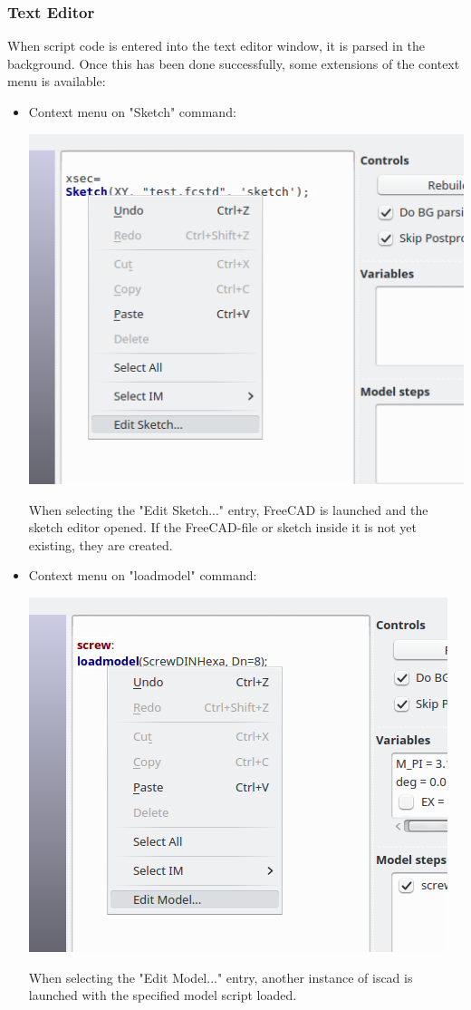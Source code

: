 \subsubsection{Text Editor}

When script code is entered into the text editor window, it is parsed in
the background. Once this has been done successfully, some extensions of
the context menu is available:

\begin{itemize}
\item Context menu on "Sketch" command:

    \includegraphics[width=0.33\linewidth]{figs/iscad/screenshot_iscad_context_sketch}
    
    When selecting the "Edit Sketch..." entry, FreeCAD is launched and
    the sketch editor opened. If the FreeCAD-file or sketch inside it is
    not yet existing, they are created.
\item Context menu on "loadmodel" command:

    \includegraphics[width=0.33\linewidth]{figs/iscad/screenshot_iscad_context_loadmodel}
    
    When selecting the "Edit Model..." entry, another instance of iscad
    is launched with the specified model script loaded.
\end{itemize}
   
